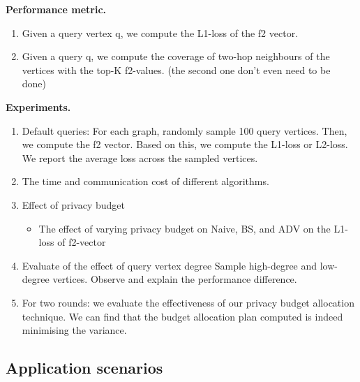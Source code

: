 \noindent
{\bf Performance metric.} 
\begin{enumerate}
    \item Given a query vertex q, we compute the L1-loss of the f2 vector. 
    \item Given a query q, we compute the coverage of two-hop neighbours of the vertices with the top-K f2-values. 
    (the second one don't even need to be done)
\end{enumerate}



\noindent
{\bf Experiments.} 


\begin{enumerate}
    \item Default queries: 
For each graph, randomly sample 100 query vertices.  Then, we compute the f2 vector. Based on this, we compute the L1-loss or L2-loss. We report the average loss across the sampled vertices. 

\item The time and communication cost of different algorithms. 

\item Effect of privacy budget 
\begin{itemize}
    \item The effect of varying privacy budget on Naive, BS, and ADV on the L1-loss of f2-vector 
\end{itemize}

\item Evaluate of the effect of query vertex degree 
Sample high-degree and low-degree vertices.  Observe and explain the performance difference. 

\item 
 For two rounds: we evaluate the effectiveness of our privacy budget allocation technique. 
We can find that the budget allocation plan computed is indeed minimising the variance. 

\end{enumerate}





\subsection{Application scenarios}


